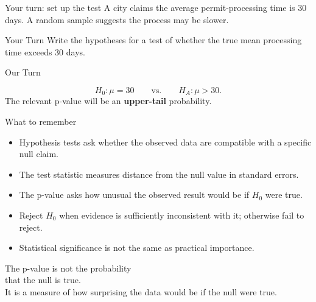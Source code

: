 \documentclass[11pt,aspectratio=169]{beamer}
\newcommand{\yourturn}[1]{%
\pause
\begin{center}
\begin{minipage}{0.90\textwidth}
\begin{alertblock}{Your Turn}
#1
\end{alertblock}
\end{minipage}
\end{center}}
\newcommand{\ourturn}[1]{%
\pause
\begin{center}
\begin{minipage}{0.90\textwidth}
\begin{block}{Our Turn}
#1
\end{block}
\end{minipage}
\end{center}}
\begin{document}
\begin{frame}{Your turn: set up the test}
A city claims the average permit-processing time is 30 days. A random sample suggests the process may be slower.

\yourturn{Write the hypotheses for a test of whether the true mean processing time exceeds 30 days.}

\vspace{0.8em}
\ourturn{
\[
H_0:\mu=30
\qquad\text{vs.}\qquad
H_A:\mu>30.
\]
The relevant p-value will be an \textbf{upper-tail} probability.}
\end{frame}

\begin{frame}{What to remember}
\begin{itemize}
  \item Hypothesis tests ask whether the observed data are compatible with a specific null claim.
  \item The test statistic measures distance from the null value in \alert{standard errors}.
  \item The p-value asks how unusual the observed result would be \alert{if $H_0$ were true}.
  \item Reject $H_0$ when evidence is sufficiently inconsistent with it; otherwise \alert{fail to reject}.
  \item Statistical significance is not the same as practical importance.
\end{itemize}

\end{frame}

\begin{frame}[standout]
\Large The p-value is not the probability\\that the null is true.\\[0.7em]
\normalsize It is a measure of how surprising the data would be if the null were true.
\end{frame}
\end{document}
